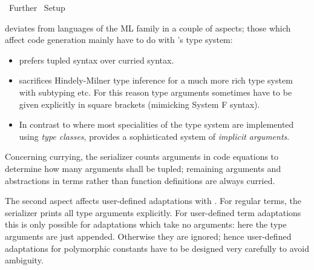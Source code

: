 %
\begin{isabellebody}%
\def\isabellecontext{Further}%
%
\isadelimtheory
%
\endisadelimtheory
%
\isatagtheory
{}\isamarkupfalse%
\ Further\isanewline
{}\ Setup\isanewline
{}%
\endisatagtheory
{\isafoldtheory}%
%
\isadelimtheory
%
\endisadelimtheory
%
\isamarkuptrue%
%
\isamarkuptrue%
%
\begin{isamarkuptext}%
 deviates from languages of the ML family in a couple
  of aspects; those which affect code generation mainly have to do with
  's type system:

  \begin{itemize}

    \item {} prefers tupled syntax over curried syntax.

    \item {} sacrifices Hindely-Milner type inference for a
      much more rich type system with subtyping etc.  For this reason
      type arguments sometimes have to be given explicitly in square
      brackets (mimicking System F syntax).

    \item In contrast to  where most specialities of
      the type system are implemented using \emph{type classes},
       provides a sophisticated system of \emph{implicit
      arguments}.

  \end{itemize}

  \noindent Concerning currying, the  serializer counts
  arguments in code equations to determine how many arguments
  shall be tupled; remaining arguments and abstractions in terms
  rather than function definitions are always curried.

  The second aspect affects user-defined adaptations with \hyperlink{command.code-const}{\mbox{}}.  For regular terms, the  serializer prints
  all type arguments explicitly.  For user-defined term adaptations
  this is only possible for adaptations which take no arguments: here
  the type arguments are just appended.  Otherwise they are ignored;
  hence user-defined adaptations for polymorphic constants have to be
  designed very carefully to avoid ambiguity.


\end{isamarkuptext}
\end{isabellebody}
